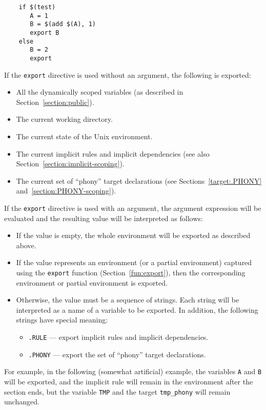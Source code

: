 \begin{verbatim}
    if $(test)
       A = 1
       B = $(add $(A), 1)
       export B
    else
       B = 2
       export
\end{verbatim}

If the \verb+export+ directive is used without an argument, the following is exported:
\begin{itemize}
\item All the dynamically scoped variables (as described in Section~\ref{section:public}).
\item The current working directory.
\item The current state of the Unix environment.
\item The current implicit rules and implicit dependencies (see also
Section~\ref{section:implicit-scoping}).
\item The current set of ``phony'' target declarations (see Sections~\ref{target:.PHONY}
and~\ref{section:PHONY-scoping}).
\end{itemize}

If the \verb+export+ directive is used with an argument, the argument expression will be evaluated
and the resulting value will be interpreted as follows:
\begin{itemize}
\item If the value is empty, the whole environment will be exported as described above.
\item If the value represents an environment (or a partial environment) captured using the
\verb+export+ function (Section~\ref{fun:export}), then the corresponding environment or partial
environment is exported.
\item Otherwise, the value must be a sequence of strings. Each string will be interpreted as a name
of a variable to be exported. In addition, the following strings have special meaning:
\begin{itemize}
\item {}\verb+.RULE+ --- export implicit rules and implicit dependencies.
\item {}\verb+.PHONY+ --- export the set of ``phony'' target declarations.
\end{itemize}
\end{itemize}

For example, in the following (somewhat artificial) example, the variables \verb+A+ and \verb+B+
will be exported, and the implicit rule will remain in the environment after the section ends, but
the variable \verb+TMP+ and the target \verb+tmp_phony+ will remain unchanged.

